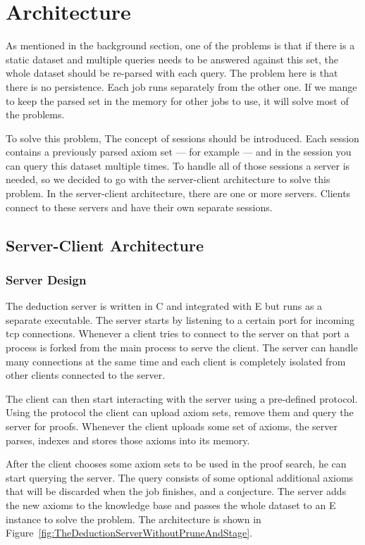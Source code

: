 \chapter{Architecture}

As mentioned in the background section, one of the problems is that if there is a static dataset and multiple queries needs to be answered against this set, the whole dataset should be re-parsed with each query. The problem here is that there is no persistence. Each job runs separately from the other one. If we mange to keep the parsed set in the memory for other jobs to use, it will solve most of the problems.

To solve this problem, The concept of sessions should be introduced. Each session contains a previously parsed axiom set --- for example --- and in the session you can query this dataset multiple times. To handle all of those sessions a server is needed, so we decided to go with the server-client architecture to solve this problem. In the server-client architecture, there are one or more servers. Clients connect to these servers and have their own separate sessions.

\section{Server-Client Architecture}
\subsection{Server Design}
The deduction server is written in C and integrated with E but runs as a separate executable. The server starts by listening to a certain port for incoming \ac{tcp} connections. Whenever a client tries to connect to the server on that port a process is forked from the main process to serve the client. The server can handle many connections at the same time and each client is completely isolated from other clients connected to the server.

The client can then start interacting with the server using a pre-defined protocol. Using the protocol the client can upload axiom sets, remove them and query the server for proofs. Whenever the client uploads some set of axioms, the server parses, indexes and stores those axioms into its memory.

After the client chooses some axiom sets to be used in the proof search, he can start querying the server. The query consists of some optional additional axioms that will be discarded when the job finishes, and a conjecture. The server adds the new axioms to the knowledge base and passes the whole dataset to an E instance to solve the problem. The architecture is shown in Figure~\ref{fig:TheDeductionServerWithoutPruneAndStage}.

